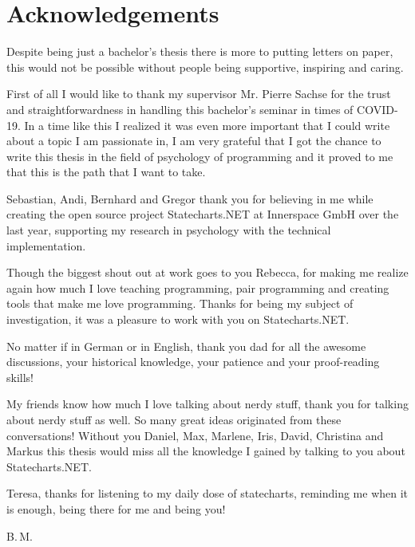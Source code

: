 \chapter{Acknowledgements}

Despite being just a bachelor's thesis there is more to putting letters on paper, this would not be possible without people being supportive, inspiring and caring.

First of all I would like to thank my supervisor Mr. Pierre Sachse for the trust and straightforwardness in handling this bachelor's seminar in times of COVID-19. In a time like this I realized it was even more important that I could write about a topic I am passionate in, I am very grateful that I got the chance to write this thesis in the field of psychology of programming and it proved to me that this is the path that I want to take.

Sebastian, Andi, Bernhard and Gregor thank you for believing in me while creating the open source project Statecharts.NET at Innerspace GmbH over the last year, supporting my research in psychology with the technical implementation.

Though the biggest shout out at work goes to you Rebecca, for making me realize again how much I love teaching programming, pair programming and creating tools that make me love programming. Thanks for being my subject of investigation, it was a pleasure to work with you on Statecharts.NET.

No matter if in German or in English, thank you dad for all the awesome discussions, your historical knowledge, your patience and your proof-reading skills!

My friends know how much I love talking about nerdy stuff, thank you for talking about nerdy stuff as well. So many great ideas originated from these conversations! Without you Daniel, Max, Marlene, Iris, David, Christina and Markus this thesis would miss all the knowledge I gained by talking to you about Statecharts.NET.

Teresa, thanks for listening to my daily dose of statecharts, reminding me when it is enough, being there for me and being you!

\vspace{0.5cm}
\noindent
B.\,M.